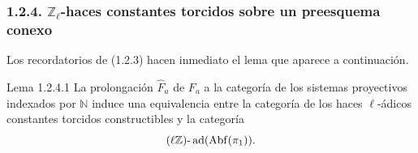\subsubsection*{1.2.4. \(\mathbb Z_\ell\)-haces constantes torcidos sobre un preesquema conexo}

Los recordatorios de (1.2.3) hacen inmediato el lema que aparece a continuación.

\begin{statement}{Lema 1.2.4.1}
La prolongación \(\widehat F_a\) de \(F_a\) a la categoría de los sistemas proyectivos indexados por \(\mathbb N\) induce una equivalencia entre la categoría de los haces \(\ell\)-ádicos constantes torcidos constructibles y la categoría
\[
(\ell\mathbb Z)\text{-}\operatorname{ad}(\operatorname{Abf}(\pi_1)).
\]
\end{statement}
